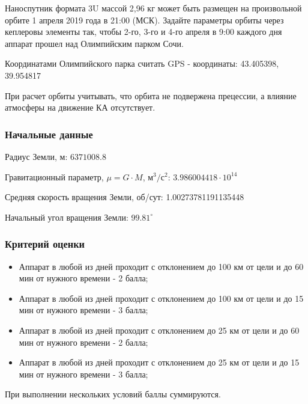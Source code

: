 
Наноспутник формата 3U массой 2,96 кг может быть размещен на произвольной орбите 1 апреля 2019 года в 21:00 (МСК). Задайте параметры орбиты через кеплеровы элементы так, чтобы 2-го, 3-го и 4-го апреля в 9:00 каждого дня аппарат прошел над Олимпийским парком Сочи.

Координатами Олимпийского парка считать GPS - координаты: 43.405398, 39.954817

При расчет орбиты учитывать, что орбита не подвержена прецессии, а влияние атмосферы на движение КА отсутствует.

\subsubsection*{Начальные данные}

Радиус Земли, м: $6371008.8$

Гравитационный параметр, $\mu = G \cdot M$, м$^3/$с$^2$: $3.986004418 \cdot 10^{14}$

Средняя скорость вращения Земли, об/сут: 1.00273781191135448

Начальный угол вращения Земли: 9$9.81^{\circ}$

\subsubsection*{Критерий оценки}

\begin{itemize}
    \item Аппарат в любой из дней проходит с отклонением до 100 км от цели и до 60 мин от нужного времени - 2 балла;
    \item Аппарат в любой из дней проходит с отклонением до 100 км от цели и до 15 мин от нужного времени - 3 балла;
    \item Аппарат в любой из дней проходит с отклонением до 25 км от цели и до 60 мин от нужного времени - 2 балла;
    \item Аппарат в любой из дней проходит с отклонением до 25 км от цели и до 15 мин от нужного времени - 3 балла;
\end{itemize}

При выполнении нескольких условий баллы суммируются.
